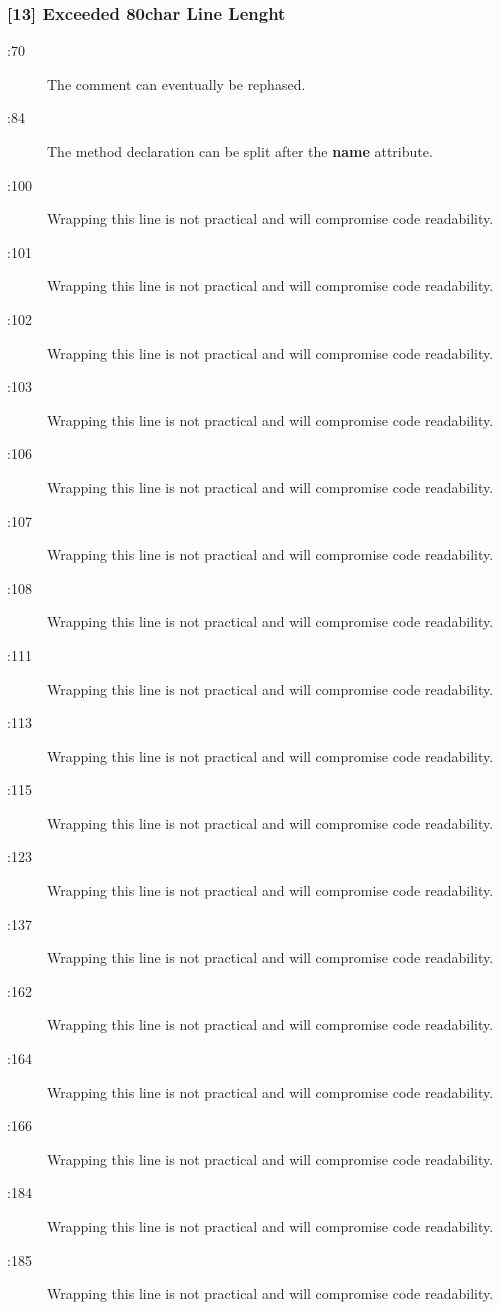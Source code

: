\subsubsection{[13] Exceeded 80char Line Lenght}
\begin{description}
	\item[:70] The comment can eventually be rephased.
	\item[:84] The method declaration can be split after the \textbf{name} attribute.
	\item[:100] Wrapping this line is not practical and will compromise code readability.
	\item[:101] Wrapping this line is not practical and will compromise code readability.
	\item[:102] Wrapping this line is not practical and will compromise code readability.
	\item[:103] Wrapping this line is not practical and will compromise code readability.
	\item[:106] Wrapping this line is not practical and will compromise code readability.
	\item[:107] Wrapping this line is not practical and will compromise code readability.
	\item[:108] Wrapping this line is not practical and will compromise code readability.
	\item[:111] Wrapping this line is not practical and will compromise code readability.
	\item[:113] Wrapping this line is not practical and will compromise code readability.
	\item[:115] Wrapping this line is not practical and will compromise code readability.
	\item[:123] Wrapping this line is not practical and will compromise code readability.
	\item[:137] Wrapping this line is not practical and will compromise code readability.
	\item[:162] Wrapping this line is not practical and will compromise code readability.
	\item[:164] Wrapping this line is not practical and will compromise code readability.
	\item[:166] Wrapping this line is not practical and will compromise code readability.
	\item[:184] Wrapping this line is not practical and will compromise code readability.
	\item[:185] Wrapping this line is not practical and will compromise code readability.

\end{description}
